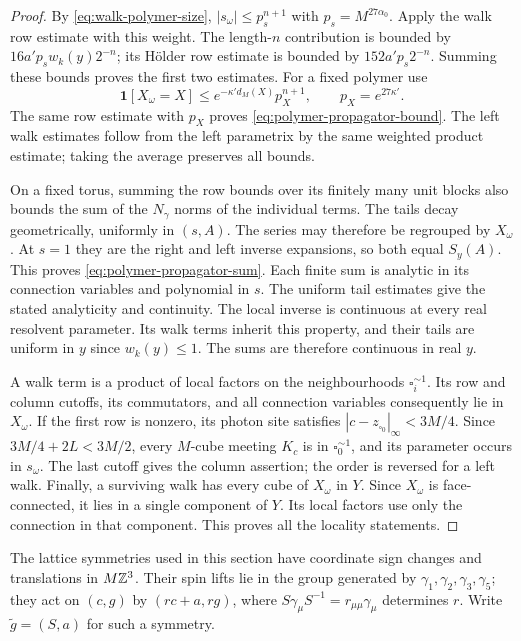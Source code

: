 \begin{proof}
By \eqref{eq:walk-polymer-size}, $|s_\omega|\le p_s^{n+1}$ with
$p_s=M^{27\alpha_0}$. Apply the walk row estimate with this weight.
The length-$n$ contribution is bounded by
$16a'p_sw_k(y)2^{-n}$; its H\"older row estimate is bounded by
$152a'p_s2^{-n}$. Summing these bounds proves the first two estimates.
For a fixed polymer use
\[
 \mathbf1[X_\omega=X]\le
       e^{-\kappa'd_M(X)}p_X^{n+1},\qquad p_X=e^{27\kappa'}.
\]
The same row estimate with $p_X$ proves
\eqref{eq:polymer-propagator-bound}. The left walk estimates follow
from the left parametrix by the same weighted product estimate; taking
the average preserves all bounds.

On a fixed torus, summing the row bounds over its finitely many unit
blocks also bounds the sum of the $N_\gamma$ norms of the individual
terms. The tails decay geometrically, uniformly in $(s,A)$. The series
may therefore be regrouped by $X_\omega$. At $s=1$ they are the right
and left inverse expansions, so both equal $S_y(A)$. This proves
\eqref{eq:polymer-propagator-sum}. Each finite sum is analytic in its
connection variables and polynomial in $s$. The uniform tail estimates
give the stated analyticity and continuity.
The local inverse is continuous at every real resolvent parameter.
Its walk terms inherit this property, and their tails are uniform in
$y$ since $w_k(y)\le1$. The sums are therefore continuous in real $y$.

A walk term is a product of local factors on the neighbourhoods
$\square_i^{\sim1}$. Its row and column cutoffs, its commutators, and
all connection variables consequently lie in $X_\omega$. If the first
row is nonzero, its photon site satisfies
$|c-z_{\square_0}|_\infty<3M/4$. Since $3M/4+2L<3M/2$, every
$M$-cube meeting $K_c$ is in $\square_0^{\sim1}$, and its parameter
occurs in $s_\omega$. The last cutoff gives the column assertion;
the order is reversed for a left walk. Finally, a surviving walk has
every cube of $X_\omega$ in $Y$. Since $X_\omega$ is face-connected,
it lies in a single component of $Y$. Its local factors use only the
connection in that component. This proves all the locality statements.
\end{proof}
The lattice symmetries used in this section have coordinate sign
changes and translations in $M\mathbb Z^3$. Their spin lifts lie in the
group generated by $\gamma_1,\gamma_2,\gamma_3,\gamma_5$; they act
on $(c,g)$ by $(rc+a,rg)$, where
$S\gamma_\mu S^{-1}=r_{\mu\mu}\gamma_\mu$ determines $r$.
Write $\widetilde g=(S,a)$ for such a symmetry.
